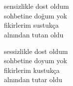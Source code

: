 \documentclass[10pt, openright, oneside]{memoir}
\theoremstyle{definition}
\begin{document}
\vspace*{\fill}
%
\newpage
{}
\vspace*{\fill}
\begin{cverse}
  \phantom{}\\
  \phantom{}\\
  \phantom{}\\
  \phantom{}\\
  \phantom{}\\
  \phantom{}\\
  \phantom{}\\
  \phantom{}\\
  \phantom{}\\
  \phantom{}\\
  \phantom{}\\
  \phantom{}\\
  \phantom{}\\
  \phantom{}\\
  \phantom{}\\
  \phantom{}\\
  \phantom{}\\
  \phantom{}\\
  \phantom{}\\
  \phantom{}\\
  \phantom{}\\
  \phantom{}\\
  \phantom{}\\
  \phantom{}\\
  \phantom{}\\
  \phantom{}\\
  \phantom{}\\
  \phantom{}\\
  \phantom{}\\
\end{cverse}
\vspace*{\fill}
%
\newpage
{}
\vspace*{\fill}
\settowidth{\versewidth}{sensizlikle dost oldum}
\begin{cverse}
  sensizlikle dost oldum \\
  sohbetine doğum yok \\
  fikirlerim sustukça \\
  alnından tutan oldu

  sessizlikle dost oldum \\
  sohbetine doyum yok \\
  fikirlerim kustukça \\
  alnından tutar oldu
\end{cverse}
\end{document}
